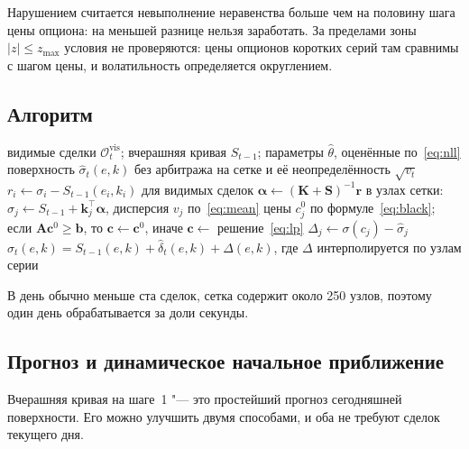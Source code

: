 \documentclass{article}
\begin{document}
Нарушением считается невыполнение неравенства больше чем на половину шага цены опциона: на меньшей разнице нельзя заработать. За пределами зоны $|z|\le z_{\max}$ условия не проверяются: цены опционов коротких серий там сравнимы с шагом цены, и волатильность определяется округлением.

\subsection{Алгоритм}

\begin{algorithm}[h]
\caption{Восстановление поверхности в день $t$}\label{alg:method}
\begin{algorithmic}[1]
\Require видимые сделки $\mathcal{O}_t^{\mathrm{vis}}$; вчерашняя кривая $S_{t-1}$; параметры $\hat\theta$, оценённые по~\eqref{eq:nll}
\Ensure поверхность $\hat\sigma_t(e,k)$ без арбитража на сетке и её неопределённость $\sqrt{v_t}$
\State $r_i\gets\sigma_i-S_{t-1}(e_i,k_i)$ для видимых сделок 
\State $\boldsymbol{\alpha}\gets(\mathbf{K}+\mathbf{S})^{-1}\mathbf{r}$ 
\State в узлах сетки: $\hat\sigma_j\gets S_{t-1}+\mathbf{k}_j^{\top}\boldsymbol{\alpha}$, дисперсия $v_j$ по~\eqref{eq:mean}
\State цены $c^0_j$ по формуле~\eqref{eq:black}; если $\mathbf{A}\mathbf{c}^0\ge\mathbf{b}$, то $\mathbf{c}\gets\mathbf{c}^0$, иначе $\mathbf{c}\gets$ решение~\eqref{eq:lp}
\State $\Delta_j\gets\sigma(c_j)-\hat\sigma_j$ 
\State \Return $\hat\sigma_t(e,k)=S_{t-1}(e,k)+\hat\delta_t(e,k)+\Delta(e,k)$, где $\Delta$ интерполируется по узлам серии
\end{algorithmic}
\end{algorithm}

В день обычно меньше ста сделок, сетка содержит около 250 узлов, поэтому один день обрабатывается за доли секунды.

\subsection{Прогноз и динамическое начальное приближение}\label{sec:dyn}

Вчерашняя кривая на шаге~1 "--- это простейший прогноз сегодняшней поверхности. Его можно улучшить двумя способами, и оба не требуют сделок текущего дня.
\end{document}
